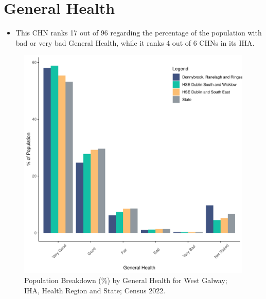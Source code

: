 \documentclass{article}
\begin{document}
\pagebreak

\section{General Health}\label{sect:GenHealth}
\begin{itemize}
\item  This CHN ranks  17 out of 96 regarding the percentage of the population with bad or very bad General Health, while it ranks   4 out of 6 CHNs in its IHA.
\end{itemize}
\begin{figure}[h]
	\centering
	\includegraphics[width = 150mm]{../figures/GenED.pdf}
	\caption{Population Breakdown (\%) by General Health for West Galway; IHA, Health Region and State;  Census 2022.}
	\label{fig:2ae19629-1a6a-13a3-e055-000000000001}
	\end{figure}
\end{document}
